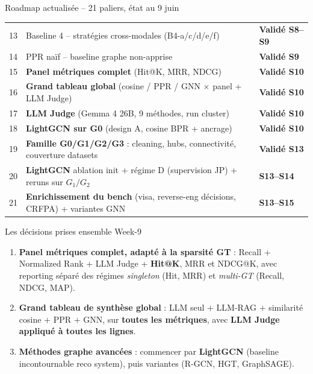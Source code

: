 \documentclass[aspectratio=169,10pt]{beamer}
\begin{document}
\begin{frame}{Roadmap actualisée -- 21 paliers, état au 9 juin}
\begin{center}
\begin{tabular}{@{}c p{8.8cm} l@{}}
    13 & Baseline 4 -- stratégies cross-modales (B4-a/c/d/e/f)                       & \textcolor{ok}{\textbf{Validé S8--S9}} \\
    \rowcolor{accentsoft}
    14 & PPR naïf -- baseline graphe non-apprise                                     & \textcolor{ok}{\textbf{Validé S9}} \\
    \midrule
    \rowcolor{accentsoft}
    15 & \textbf{Panel métriques complet} (Hit@K, MRR, NDCG)                         & \textcolor{ok}{\textbf{Validé S10}} \\
    \rowcolor{accentsoft}
    16 & \textbf{Grand tableau global} (cosine / PPR / GNN $\times$ panel + LLM Judge)     & \textcolor{ok}{\textbf{Validé S10}} \\
    \rowcolor{accentsoft}
    17 & \textbf{LLM Judge} (Gemma 4 26B, 9 méthodes, run cluster)               & \textcolor{ok}{\textbf{Validé S10}} \\
    \rowcolor{accentsoft}
    18 & \textbf{LightGCN sur G0} (design A, cosine BPR + ancrage)                   & \textcolor{ok}{\textbf{Validé S10}} \\
    \midrule
    \rowcolor{green!10}
    19 & \textbf{Famille G0/G1/G2/G3} : cleaning, hubs, connectivité, couverture datasets & \textcolor{ok}{\textbf{Validé S13}} \\
    \rowcolor{green!10}
    20 & \textbf{LightGCN} ablation init + régime D (supervision JP) + reruns sur $G_1/G_2$ & \textcolor{accent}{\textbf{S13--S14}} \\
    \rowcolor{green!10}
    21 & \textbf{Enrichissement du bench} (visa, reverse-eng décisions, CRFPA) + variantes GNN & \textcolor{accent}{\textbf{S13--S15}} \\
    \bottomrule
  \end{tabular}
  \end{center}
\end{frame}

\begin{frame}{Les décisions prises ensemble Week-9}
  \footnotesize
  \vspace{0.3em}
  \begin{enumerate}\setlength{\itemsep}{0.9em}
    \item \textbf{Panel métriques complet, adapté à la sparsité GT} :
    Recall + Normalized Rank + LLM Judge + \textbf{Hit@K}, MRR et NDCG@K, avec reporting séparé
    des régimes \textit{singleton} (Hit, MRR) et \textit{multi-GT} (Recall, NDCG, MAP).
    \item \textbf{Grand tableau de synthèse global} : LLM seul $+$ LLM-RAG $+$
    similarité cosine $+$ PPR $+$ GNN, sur \textbf{toutes les métriques},
    avec \textbf{LLM Judge appliqué à toutes les lignes}.
    \item \textbf{Méthodes graphe avancées} : commencer par \textbf{LightGCN}
    (baseline incontournable reco system), puis variantes (R-GCN, HGT, GraphSAGE).
  \end{enumerate}
\end{frame}
\end{document}
